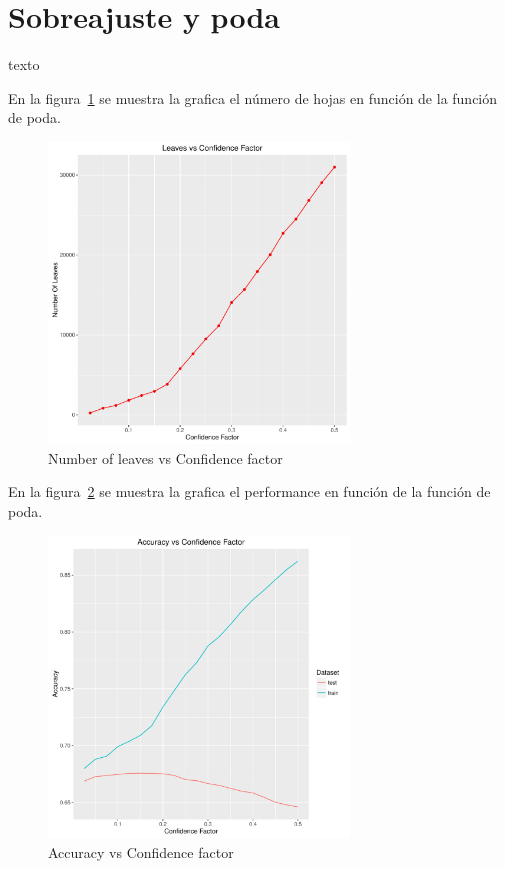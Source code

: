 \section{Sobreajuste y poda}


texto



En la figura~\ref{fig:3a} se muestra la grafica el número de hojas en función de la función de poda.

\begin{figure}
  \centering
  \includegraphics[width = 8cm]{3a.pdf}
  \caption{Number of leaves vs Confidence factor}
  \label{fig:3a}
\end{figure}

En la figura~\ref{fig:3b} se muestra la grafica el performance en función de la función de poda.

\begin{figure}
  \centering
  \includegraphics[width = 8cm]{3b.pdf}
  \caption{Accuracy vs Confidence factor}
  \label{fig:3b}
\end{figure}


